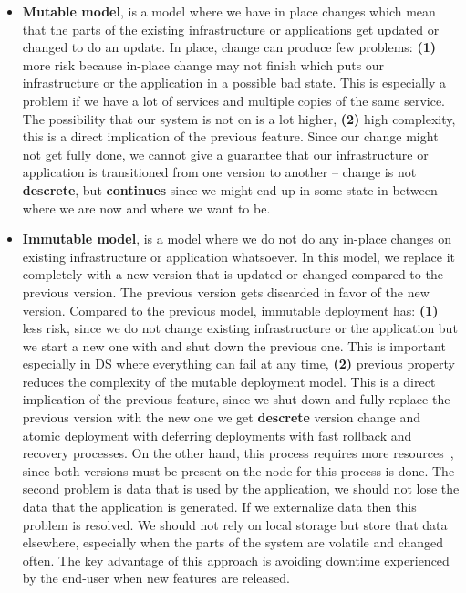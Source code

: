 \begin{itemize}
	\item \textbf{Mutable model}, is a model where we have in place changes which mean that the parts of the existing infrastructure or applications get updated or changed to do an update. In place, change can produce few problems: \textbf{(1)} more risk because in-place change may not finish which puts our infrastructure or the application in a possible bad state. This is especially a problem if we have a lot of services and multiple copies of the same service. The possibility that our system is not on is a lot higher, \textbf{(2)} high complexity, this is a direct implication of the previous feature. Since our change might not get fully done, we cannot give a guarantee that our infrastructure or application is transitioned from one version to another -- change is not \textbf{descrete}, but \textbf{continues} since we might end up in some state in between where we are now and where we want to be.
	\item \textbf{Immutable model}, is a model where we do not do any in-place changes on existing infrastructure or application whatsoever. In this model, we replace it completely with a new version that is updated or changed compared to the previous version. The previous version gets discarded in favor of the new version. Compared to the previous model, immutable deployment has: \textbf{(1)} less risk, since we do not change existing infrastructure or the application but we start a new one with and shut down the previous one. This is important especially in DS where everything can fail at any time, \textbf{(2)} previous property reduces the complexity of the mutable deployment model. This is a direct implication of the previous feature, since we shut down and fully replace the previous version with the new one we get \textbf{descrete} version change and atomic deployment with deferring deployments with fast rollback and recovery processes. On the other hand, this process requires more resources~\cite{Helland16}, since both versions must be present on the node for this process is done. The second problem is data that is used by the application, we should not lose the data that the application is generated. If we externalize data then this problem is resolved. We should not rely on local storage but store that data elsewhere, especially when the parts of the system are volatile and changed often. The key advantage of this approach is avoiding downtime experienced by the end-user when new features are released.
\end{itemize}

